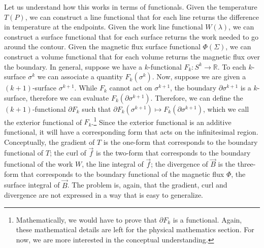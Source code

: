 Let us understand how this works in terms of functionals. Given the temperature $T(P)$, we can construct a line functional that for each line returns the difference in temperature at the endpoints. Given the work line functional $W(\lambda)$, we can construct a surface functional that for each surface returns the work needed to go around the contour. Given the magnetic flux surface functional $\Phi(\Sigma)$, we can construct a volume functional that for each volume returns the magnetic flux over the boundary. In general, suppose we have a $k$-functional $F_k : S^k \to \mathbb{R}$. To each $k$-surface $\sigma^k$ we can associate a quantity $F_k(\sigma^k)$. Now, suppose we are given a $(k+1)$-surface $\sigma^{k+1}$. While $F_k$ cannot act on $\sigma^{k+1}$, the boundary $\partial \sigma^{k+1}$ is a $k$-surface, therefore we can evaluate $F_k(\partial \sigma^{k+1})$. Therefore, we can define the $(k+1)$-functional $\partial F_k$ such that $\partial F_k (\sigma^{k+1}) \mapsto F_k(\partial \sigma^{k+1})$, which we call the exterior functional of $F_k$.\footnote{Mathematically, we would have to prove that $\partial F_k$ is a functional. Again, these mathematical details are left for the physical mathematics section. For now, we are more interested in the conceptual understanding.} Since the exterior functional is an additive functional, it will have a corresponding form that acts on the infinitesimal region. Conceptually, the gradient of $T$ is the one-form that corresponds to the boundary functional of $T$; the curl of $\vec{f}$ is the two-form that corresponds to the boundary functional of the work $W$, the line integral of $\vec{f}$; the divergence of $\vec{B}$ is the three-form that corresponds to the boundary functional of the magnetic flux $\Phi$, the surface integral of $\vec{B}$. The problem is, again, that the gradient, curl and divergence are not expressed in a way that is easy to generalize.


